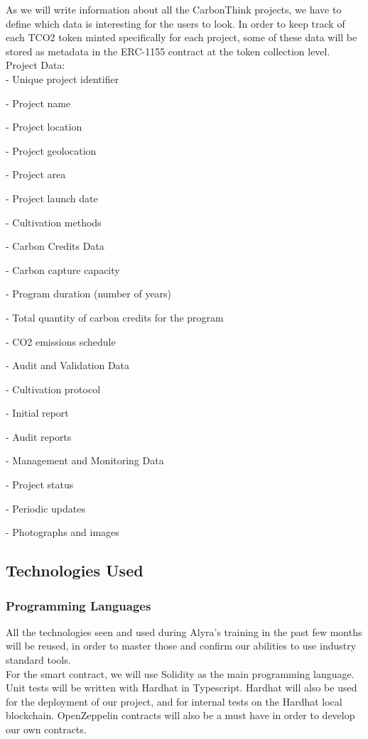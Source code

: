 \documentclass[a4paper, 12pt]{article}
\begin{document}
As we will write information about all the CarbonThink projects, we have to define which data is interesting for the users to look. In order to keep track of each TCO2 token minted specifically for each project, some of these data will be stored as metadata in the ERC-1155 contract at the token collection level.\\

Project Data:\\

- Unique project identifier

- Project name

- Project location

- Project geolocation

- Project area

- Project launch date

- Cultivation methods

- Carbon Credits Data

- Carbon capture capacity

- Program duration (number of years)

- Total quantity of carbon credits for the program

- CO2 emissions schedule

- Audit and Validation Data

- Cultivation protocol

- Initial report

- Audit reports

- Management and Monitoring Data

- Project status

- Periodic updates

- Photographs and images


\subsection{Technologies Used}
\subsubsection{Programming Languages}

All the technologies seen and used during Alyra's training in the past few months will be reused, in order to master those and confirm our abilities to use industry standard tools.\\

For the smart contract, we will use Solidity as the main programming language. Unit tests will be written with Hardhat in Typescript. Hardhat will also be used for the deployment of our project, and for internal tests on the Hardhat local blockchain. OpenZeppelin contracts will also be a must have in order to develop our own contracts.\\
\end{document}
